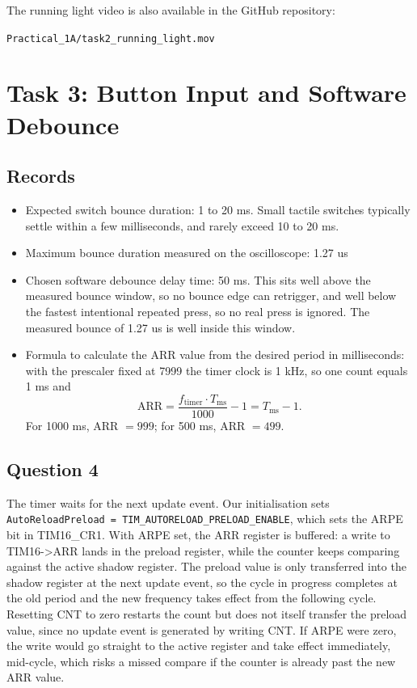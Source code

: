 \documentclass[11pt]{article}
\begin{document}
The running light video is also available in the GitHub repository:

\texttt{Practical\_1A/task2\_running\_light.mov}






\section{Task 3: Button Input and Software Debounce}

\subsection{Records}
\begin{itemize}
    \item Expected switch bounce duration: 1 to 20 ms. Small tactile switches typically settle within a few milliseconds, and rarely exceed 10 to 20 ms.
    \item Maximum bounce duration measured on the oscilloscope: 1.27 us
    \item Chosen software debounce delay time: 50 ms. This sits well above the measured bounce window, so no bounce edge can retrigger, and well below the fastest intentional repeated press, so no real press is ignored. The measured bounce of 1.27 us is well inside this window.
    \item Formula to calculate the ARR value from the desired period in milliseconds: with the prescaler fixed at 7999 the timer clock is 1 kHz, so one count equals 1 ms and
    \[
        \text{ARR} = \frac{f_{\text{timer}} \cdot T_{\text{ms}}}{1000} - 1 = T_{\text{ms}} - 1.
    \]
    For 1000 ms, ARR $= 999$; for 500 ms, ARR $= 499$.
\end{itemize}

\subsection{Question 4}
The timer waits for the next update event. Our initialisation sets \texttt{AutoReloadPreload = TIM\_AUTORELOAD\_PRELOAD\_ENABLE}, which sets the ARPE bit in TIM16\_CR1. With ARPE set, the ARR register is buffered: a write to TIM16->ARR lands in the preload register, while the counter keeps comparing against the active shadow register. The preload value is only transferred into the shadow register at the next update event, so the cycle in progress completes at the old period and the new frequency takes effect from the following cycle. Resetting CNT to zero restarts the count but does not itself transfer the preload value, since no update event is generated by writing CNT. If ARPE were zero, the write would go straight to the active register and take effect immediately, mid-cycle, which risks a missed compare if the counter is already past the new ARR value.
\end{document}
